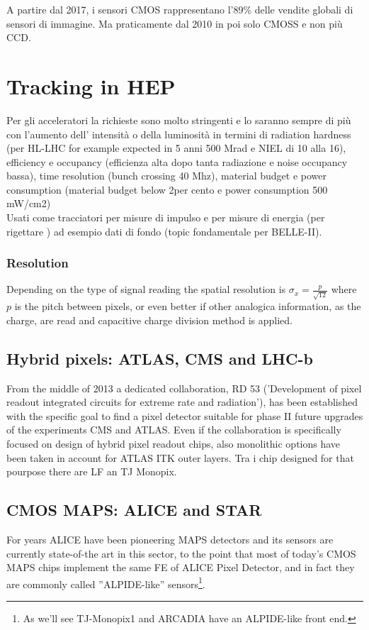 A partire dal 2017, i sensori CMOS rappresentano l'89\% delle vendite globali di sensori di immagine. Ma praticamente dal 2010 in poi solo CMOSS e non più CCD.\\

\section{Tracking in HEP}
    Per gli acceleratori la richieste sono molto stringenti e lo saranno sempre di più con l'aumento dell' intensità o della luminosità in termini di radiation hardness (per HL-LHC for example expected in 5 anni 500 Mrad e NIEL di 10 alla 16), efficiency e occupancy (efficienza alta dopo tanta radiazione e noise occupancy bassa), time resolution (bunch crossing 40 Mhz), material budget e power consumption (material budget below 2per cento e power consumption 500 mW/cm2)\\
    Usati come tracciatori per misure di impulso e per misure di energia (per rigettare ) ad esempio dati di fondo (topic fondamentale per BELLE-II).

    \subsubsection{Resolution}
        Depending on the type of signal reading the spatial resolution is  $\sigma_x = \frac{p}{\sqrt{12}}$ where $p$ is the pitch between pixels, or even better if other 
        analogica information, as the charge, are read and capacitive charge division method is applied.

    \subsection{Hybrid pixels: ATLAS, CMS and LHC-b}
        From the middle of 2013 a dedicated collaboration, RD 53 ('Development of pixel readout integrated circuits for extreme rate and radiation'), has been established with the specific goal to find a pixel detector suitable for phase II future upgrades of the experiments CMS and ATLAS. Even if the collaboration is specifically focused on design of hybrid pixel readout chips, also monolithic options have been taken in account for ATLAS ITK outer layers. Tra i chip designed for that pourpose there are LF an TJ Monopix.
        
    \subsection{CMOS MAPS: ALICE and STAR}
         For years ALICE have been pioneering MAPS detectors and its sensors are currently state-of-the art in this sector, to the point that most of today’s CMOS MAPS chips implement the same FE of ALICE Pixel Detector, and in fact they are commonly called ”ALPIDE-like” sensors\footnote{As we'll see TJ-Monopix1 and ARCADIA have an ALPIDE-like front end.}.
        
